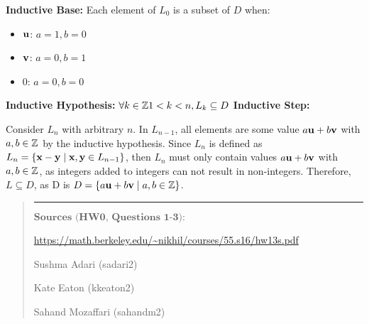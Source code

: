 \documentclass[11pt]{article}
\begin{document}
\begin{solution}[2]
\item 
\textbf{Inductive Base:} Each element of $L_0$ is a subset of $D$ when:
\begin{itemize}
\item ${\bf u}$: $a = 1, b = 0$
\item ${\bf v}$: $a = 0, b = 1$
\item ${0}$: $a = 0, b = 0$
\end{itemize} 
\textbf{Inductive Hypothesis:} $\forall k \in \Z 1 < k < n, L_k \subseteq D$
\textbf{Inductive Step:} 
\item Consider $L_n$ with arbitrary $n$. In $L_{n-1}$, all elements are some value $a{\bf u} + b{\bf v}$ with $a, b \in \Z$ by the inductive hypothesis. Since $L_n$ is defined as $L_n = \{ {\bf x}- {\bf y} \mid {\bf x}, {\bf y}  \in L_{n-1} \}$, then $L_n$ must only contain values $a{\bf u} + b{\bf v}$ with $a, b \in \Z$, as integers added to integers can not result in non-integers. Therefore, $L \subseteq D$, as D is $D = \{ a{\bf u}+b{\bf v} \mid a,b \in \Z \}$.
\end{solution}
\begin{quote}
\hrule
$\textbf{Sources (HW0, Questions 1-3):}$
\item \url{https://math.berkeley.edu/~nikhil/courses/55.s16/hw13s.pdf}
\item Sushma Adari (sadari2)
\item Kate Eaton (kkeaton2)
\item Sahand Mozaffari (sahandm2)
\end{quote}
\end{document}
